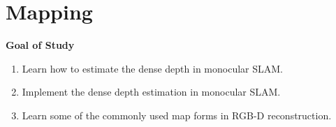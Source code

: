 \chapter{Mapping}
\begin{mdframed}  
	\textbf{Goal of Study}
	\begin{enumerate}[labelindent=0em,leftmargin=1.5em]
		\item Learn how to estimate the dense depth in monocular SLAM. 
		\item Implement the dense depth estimation in monocular SLAM.
		\item Learn some of the commonly used map forms in RGB-D reconstruction. 
	\end{enumerate}
\end{mdframed}


